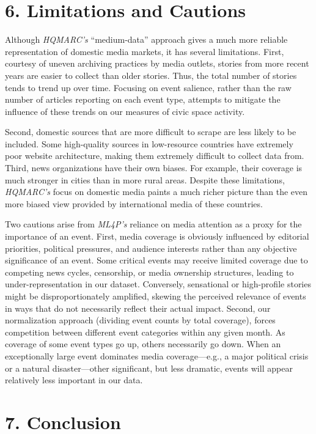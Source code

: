 \documentclass[
  letterpaper,
  DIV=11,
  numbers=noendperiod]{scrartcl}
\begin{document}
\hypertarget{sec-limitations}{%
\section{6. Limitations and Cautions}\label{sec-limitations}}

Although \emph{HQMARC's} ``medium-data'' approach gives a much more
reliable representation of domestic media markets, it has several
limitations. First, courtesy of uneven archiving practices by media
outlets, stories from more recent years are easier to collect than older
stories. Thus, the total number of stories tends to trend up over time.
Focusing on event salience, rather than the raw number of articles
reporting on each event type, attempts to mitigate the influence of
these trends on our measures of civic space activity.

Second, domestic sources that are more difficult to scrape are less
likely to be included. Some high-quality sources in low-resource
countries have extremely poor website architecture, making them
extremely difficult to collect data from. Third, news organizations have
their own biases. For example, their coverage is much stronger in cities
than in more rural areas. Despite these limitations, \emph{HQMARC's}
focus on domestic media paints a much richer picture than the even more
biased view provided by international media of these countries.

Two cautions arise from \emph{ML4P's} reliance on media attention as a
proxy for the importance of an event. First, media coverage is obviously
influenced by editorial priorities, political pressures, and audience
interests rather than any objective significance of an event. Some
critical events may receive limited coverage due to competing news
cycles, censorship, or media ownership structures, leading to
under-representation in our dataset. Conversely, sensational or
high-profile stories might be disproportionately amplified, skewing the
perceived relevance of events in ways that do not necessarily reflect
their actual impact. Second, our normalization approach (dividing event
counts by total coverage), forces competition between different event
categories within any given month. As coverage of some event types go
up, others necessarily go down. When an exceptionally large event
dominates media coverage---e.g., a major political crisis or a natural
disaster---other significant, but less dramatic, events will appear
relatively less important in our data.

\hypertarget{sec-conclusion}{%
\section{7. Conclusion}\label{sec-conclusion}}
\end{document}
